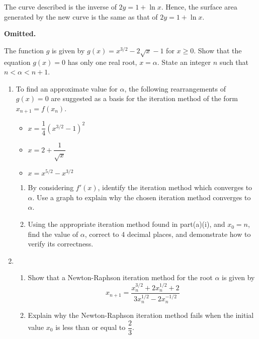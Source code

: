\documentclass{jhwhw}
\begin{document}
            \noindent The curve described is the inverse of $2y = 1 + \ln x$. Hence, the surface area generated by the new curve is the same as that of $2y = 1 + \ln x$.


    \problem{}
        \textbf{Omitted.}

    \problem{}
        The function $g$ is given by $g(x) = x^{3/2} - 2\sqrt{x} - 1$ for $x \geq 0$. Show that the equation $g(x) = 0$ has only one real root, $x = \alpha$. State an integer $n$ such that $n < \alpha < n + 1$.

        \begin{enumerate}
            \item To find an approximate value for $\alpha$, the following rearrangements of $g(x) = 0$ are suggested as a basis for the iteration method of the form $x_{n+1} = f(x_n)$.
            \begin{itemize}
                \item $x = \dfrac14 \left(x^{3/2} - 1\right)^2$
                \item $x = 2 + \dfrac1{\sqrt{x}}$
                \item $x = x^{5/2} - x^{3/2}$
            \end{itemize}

            \begin{enumerate}
                \item By considering $f'(x)$, identify the iteration method which converges to $\alpha$. Use a graph to explain why the chosen iteration method converges to $\alpha$.
                \item Using the appropriate iteration method found in part(a)(i), and $x_0 = n$, find the value of $\alpha$, correct to 4 decimal places, and demonstrate how to verify its correctness.
            \end{enumerate}
            \item \begin{enumerate}
                \item Show that a Newton-Raphson iteration method for the root $\alpha$ is given by
                \begin{equation*}
                    x_{n+1} = \dfrac{x_n^{3/2} + 2x_n^{1/2} + 2}{3x_n^{1/2} - 2x_n^{-1/2}}
                \end{equation*}
                \item Explain why the Newton-Raphson iteration method fails when the initial value $x_0$ is less than or equal to $\dfrac23$.
            \end{enumerate}
        \end{enumerate}
\end{document}
